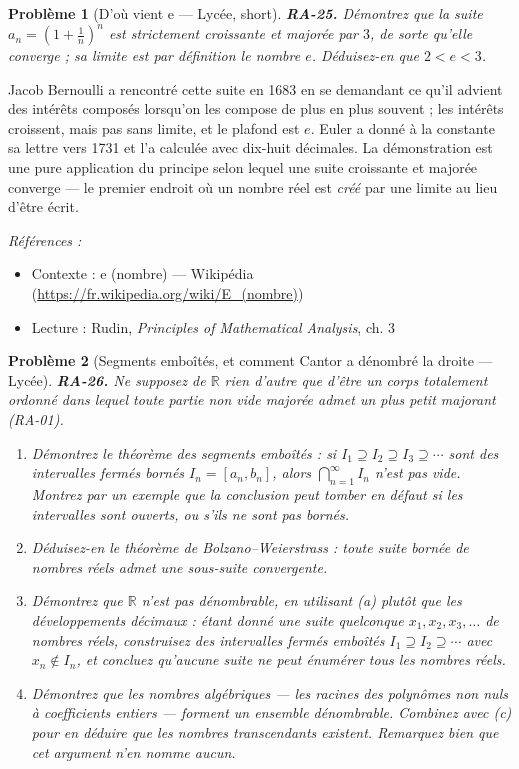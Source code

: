 \documentclass[11pt]{article}
\newtheorem{problem}{Problème}
\newenvironment{refs}{\par\small\noindent\emph{Références :}\begin{itemize}\setlength\itemsep{0pt}}{\end{itemize}\normalsize}
\begin{document}
\bigskip

\begin{problem}[{D'où vient e --- Lycée, short}]
\textbf{RA-25.} Démontrez que la suite
$ a_n = \left( 1 + \frac{1}{n} \right)^{n} $ est strictement croissante et majorée par
$ 3 $, de sorte qu'elle converge ; sa limite est par définition le nombre $ e $. Déduisez-en
que $ 2 < e < 3 $.
\end{problem}

\noindent Jacob Bernoulli a rencontré cette suite en 1683 en se demandant ce qu'il advient
des intérêts composés lorsqu'on les compose de plus en plus souvent ; les intérêts croissent, mais
pas sans limite, et le plafond est $ e $. Euler a donné à la constante sa lettre vers 1731 et l'a
calculée avec dix-huit décimales. La démonstration est une pure application du principe selon lequel
une suite croissante et majorée converge --- le premier endroit où un nombre réel est \textit{créé} par
une limite au lieu d'être écrit.

\begin{refs}
\item Contexte : e (nombre) --- Wikipédia (\url{https://fr.wikipedia.org/wiki/E_(nombre)})
\item Lecture : Rudin, \textit{Principles of Mathematical Analysis}, ch. 3
\end{refs}

\bigskip

\begin{problem}[{Segments emboîtés, et comment Cantor a dénombré la droite --- Lycée}]
\textbf{RA-26.} Ne supposez de $ \mathbb{R} $ rien d'autre que d'être un corps totalement
ordonné dans lequel toute partie non vide majorée admet un plus petit majorant (RA-01).
\begin{enumerate}
\item[(a)] Démontrez le théorème des segments emboîtés : si $ I_1 \supseteq I_2 \supseteq I_3 \supseteq \cdots $
sont des intervalles fermés bornés $ I_n = [a_n, b_n] $, alors $ \bigcap_{n=1}^{\infty} I_n $ n'est
pas vide. Montrez par un exemple que la conclusion peut tomber en défaut si les intervalles sont
ouverts, ou s'ils ne sont pas bornés.
\item[(b)] Déduisez-en le théorème de Bolzano--Weierstrass : toute suite bornée de nombres réels admet une
sous-suite convergente.
\item[(c)] Démontrez que $ \mathbb{R} $ n'est pas dénombrable, en utilisant (a) plutôt que les
développements décimaux : étant donné une suite quelconque $ x_1, x_2, x_3, \dots $ de nombres
réels, construisez des intervalles fermés emboîtés $ I_1 \supseteq I_2 \supseteq \cdots $ avec
$ x_n \notin I_n $, et concluez qu'aucune suite ne peut énumérer tous les nombres réels.
\item[(d)] Démontrez que les nombres algébriques --- les racines des polynômes non nuls à coefficients
entiers --- forment un ensemble dénombrable. Combinez avec (c) pour en déduire que les nombres
transcendants existent. Remarquez bien que cet argument n'en nomme aucun.
\end{enumerate}

\end{problem}
\end{document}
